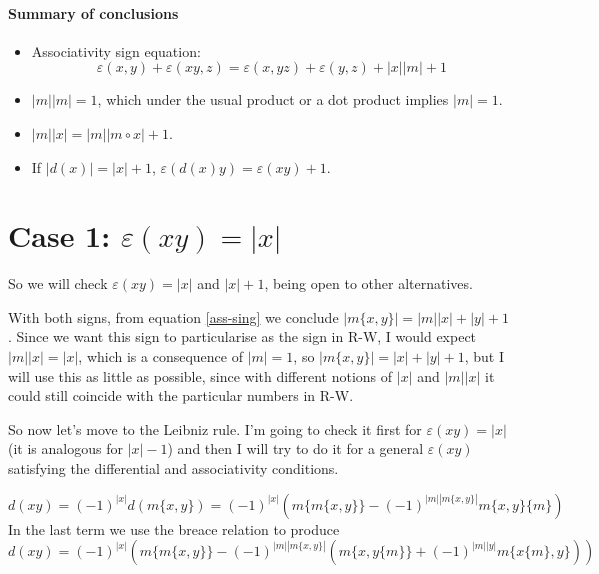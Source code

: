 \documentclass[twoside]{article}
\begin{document}
%

\paragraph{Summary of conclusions}

\begin{itemize}
\item Associativity sign equation: $$\varepsilon(x,y)+\varepsilon(xy,z)=\varepsilon(x,yz)+\varepsilon(y,z)+|x||m|+1$$

\item $|m||m|=1$, which under the usual product or a dot product implies $|m|=1$.
\item $|m||x|=|m||m\circ x|+1$.
\item If $|d(x)|=|x|+1$, $\varepsilon(d(x)y)=\varepsilon(xy)+1$.

\end{itemize}


\section{Case 1: $\varepsilon(xy)=|x|$}


So we will check $\varepsilon(xy)=|x|$ and $|x|+1$, being open to other alternatives.

 With both signs, from equation \ref{ass-sing} we conclude $|m\{x,y\}|=|m||x|+|y|+1$. Since we want this sign to particularise as the sign in R-W, I would expect $|m||x|=|x|$, which is a consequence of $|m|=1$, so $|m\{x,y\}|=|x|+|y|+1$, but I will use this as little as possible, since with different notions of $|x|$ and $|m||x|$ it could still coincide with the particular numbers in R-W.

So now let's move to the Leibniz rule. I'm going to check it first for $\varepsilon(xy)=|x|$ (it is analogous for $|x|-1$) and then I will try to do it for a general $\varepsilon(xy)$ satisfying the differential and associativity conditions.

\[
d(xy)=(-1)^{|x|}d(m\{x,y\})=(-1)^{|x|}(m\{m\{x,y\}\}-(-1)^{|m||m\{x,y\}|}m\{x,y\}\{m\})
\]
In the last term we use the breace relation to produce
\[
d(xy)=(-1)^{|x|}(m\{m\{x,y\}\}-(-1)^{|m||m\{x,y\}|}(m\{x,y\{m\}\}+(-1)^{|m||y|}m\{x\{m\},y\}))
\]
\end{document}
